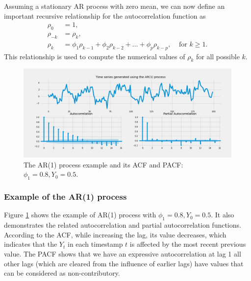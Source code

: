 Assuming a stationary AR process with zero mean, we can now define an important recursive relationship \cite{cryer2008time} for the autocorrelation function as \begin{equation}
\begin{aligned}
    \rho_0 &= 1, \\ 
    \rho_{-k} &= \rho_{k}, \\
    \rho_k &= \phi_{1}\rho_{k - 1} + \phi_{2}\rho_{k - 2} + \ldots + \phi_{p}\rho_{k - p}, & \text{ for } k \geq 1.
\end{aligned}
\end{equation} This relationship is used to compute the numerical values of $\rho_k$ for all possible $k$.

\begin{figure}[!ht]
\centering
\includegraphics[width=1\textwidth, height=0.5\textwidth]{figures/chapter_03/ar_1.png}
\caption{The AR(1) process example and its ACF and PACF: $\phi_1 = 0.8, Y_0 = 0.5$.}
\label{fig:ar_1_example}
\end{figure}

\subsubsection{Example of the AR(1) process}

Figure \ref{fig:ar_1_example} shows the example of AR(1) process with $\phi_1 = 0.8, Y_0 = 0.5$. It also demonstrates the related autocorrelation and partial autocorrelation functions. 
According to the ACF, while increasing the lag, its value decreases, which indicates that the $Y_t$ in each timestamp $t$ is affected by the most recent previous value. 
The PACF shows that we have an expressive autocorrelation at lag 1 all other lags (which are cleared from the influence of earlier lags) have values that can be considered as non-contributory.

